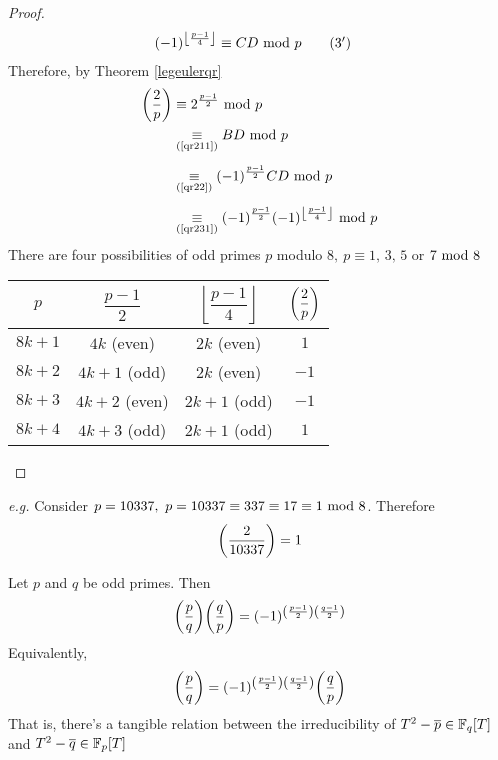 \begin{proof}
\begin{align*}
(-1)^{\left\lfloor \frac{p-1}{4}\right\rfloor} &\equiv CD \text{ mod }{p} \label{qr231}\tag{$3'$}
\end{align*}
Therefore, by Theorem \ref{legeulerqr}
\begin{align*}
\ls{2}{p} &\equiv 2^{\frac{p-1}{2}}\modar{p}\\
&\underset{\refp{qr211}}{\equiv} BD\modar{p}\\[0.5em]
&\underset{\refp{qr22}}{\equiv} (-1)^{\frac{p-1}{2}} CD\modar{p}\\[0.5em]
&\underset{\refp{qr231}}{\equiv} (-1)^{\frac{p-1}{2}}(-1)^{\left\lfloor \frac{p-1}{4}\right\rfloor}\modar{p}
\end{align*}
There are four possibilities of odd primes $p$ modulo $8,\ p\equiv 1,\,3,\,5$ or $7\text{ mod }{8}$\\
\begin{center}
{\renewcommand{\arraystretch}{2}%
\begin{tabular}{|c|c|c|c|}
\hline
$p$ & $\dfrac{p-1}{2}$ & $\left\lfloor \dfrac{p-1}{4}\right\rfloor$ & $\bigg(\dfrac{2}{p}\bigg)$\\[0.5em]
\hline
$8k + 1$ & $4k$ (even) & $2k$ (even) & $1$ \\
\hline
$8k + 2$ & $4k + 1$ (odd) & $2k$ (even) & $-1$ \\
\hline
$8k + 3$ & $4k + 2$ (even) & $2k + 1$ (odd) & $-1$ \\
\hline
$8k + 4$ & $4k + 3$ (odd) & $2k + 1$ (odd) & $1$ \\
\hline
\end{tabular}}
\end{center}
\end{proof}


\emph{e.g.} Consider $p = 10337,\ p = 10337 \equiv 337 \equiv 17 \equiv 1 \text{ mod }{8}$. Therefore
\[\bigg(\dfrac{2}{10337}\bigg) = 1\]

\vspace*{1em}

\begin{theorem}
Let $p$ and $q$ be odd primes. Then
\[\bigg(\dfrac{p}{q}\bigg)\bigg(\dfrac{q}{p}\bigg) = (-1)^{\left(\frac{p-1}{2}\right)\left(\frac{q-1}{2}\right)}\]
Equivalently,
\[\bigg(\dfrac{p}{q}\bigg) = (-1)^{\left(\frac{p-1}{2}\right)\left(\frac{q-1}{2}\right)}\bigg(\dfrac{q}{p}\bigg)\]
That is, there's a tangible relation between the irreducibility of $T^2 - \overline{p} \in \mathbb F_q[T]$ and $T^2 - \overline{q} \in \mathbb F_p[T]$
\end{theorem}

